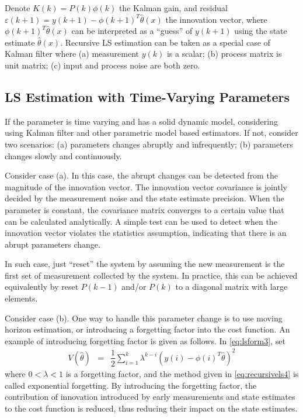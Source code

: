 Denote $K(k) = P(k)\phi(k)$ the Kalman gain, and residual $\varepsilon(k+1) = y(k+1) - \phi(k+1)^T\hat{\theta}(x)$ the innovation vector, where $\phi(k+1)^T\hat{\theta}(x)$ can be interpreted as a ``guess'' of $y(k+1)$ using the state estimate $\hat{\theta}(x)$. Recursive LS estimation can be taken as a special case of Kalman filter where (a) measurement $y(k)$ is a scalar; (b) process matrix is unit matrix; (c) input and process noise are both zero.

\subsection{LS Estimation with Time-Varying Parameters}

If the parameter is time varying and has a solid dynamic model, considering using Kalman filter and other parametric model based estimators. If not, consider two scenarios: (a) parameters changes abruptly and infrequently; (b) parameters changes slowly and continuously.

Consider case (a). In this case, the abrupt changes can be detected from the magnitude of the innovation vector. The innovation vector covariance is jointly decided by the measurement noise and the state estimate precision. When the parameter is constant, the covariance matrix converges to a certain value that can be calculated analytically. A simple test can be used to detect when the innovation vector violates the statistics assumption, indicating that there is an abrupt parameters change.

In such case, just ``reset'' the system by assuming the new measurement is the first set of measurement collected by the system. In practice, this can be achieved equivalently by reset $P(k-1)$ and/or $P(k)$ to a diagonal matrix with large elements.

Consider case (b). One way to handle this parameter change is to use moving horizon estimation, or introducing a forgetting factor into the cost function. An example of introducing forgetting factor is given as follows. In \eqref{eq:lsform3}, set
\begin{eqnarray}
  V(\hat{\theta}) &=& \dfrac{1}{2}\sum_{i=1}^{k} \lambda^{k-i}\left(y(i) - \phi(i)^T\hat{\theta}\right)^2 \label{eq:recursivels4}
\end{eqnarray}
where $0 < \lambda < 1$ is a forgetting factor, and the method given in \eqref{eq:recursivels4} is called exponential forgetting. By introducing the forgetting factor, the contribution of innovation introduced by early measurements and state estimates to the cost function is reduced, thus reducing their impact on the state estimates.


